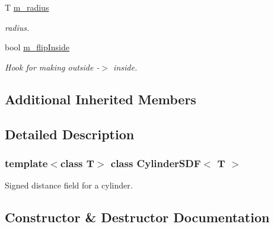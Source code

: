 \begin{DoxyCompactItemize}
\mbox{\label{classCylinderSDF_ad5ff6ceb3b872fcea0534f89d73f0268}} 
T \hyperlink{classCylinderSDF_ad5ff6ceb3b872fcea0534f89d73f0268}{m\+\_\+radius}
\begin{DoxyCompactList}\small\item\em radius. \end{DoxyCompactList}\item 
\mbox{\label{classCylinderSDF_a1c57a3a6464820197347bcdc5977f7ba}} 
bool \hyperlink{classCylinderSDF_a1c57a3a6464820197347bcdc5977f7ba}{m\+\_\+flip\+Inside}
\begin{DoxyCompactList}\small\item\em Hook for making outside -\/$>$ inside. \end{DoxyCompactList}\end{DoxyCompactItemize}
\subsection*{Additional Inherited Members}


\subsection{Detailed Description}
\subsubsection*{template$<$class T$>$\newline
class Cylinder\+S\+D\+F$<$ T $>$}

Signed distance field for a cylinder. 

\subsection{Constructor \& Destructor Documentation}
\mbox{\label{classCylinderSDF_a0c710e871e7e7eb37f379c79c3412607}} 
